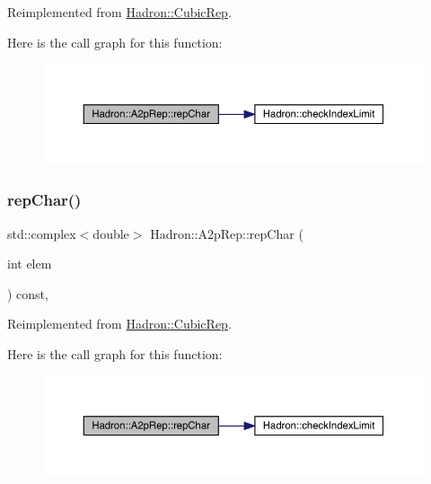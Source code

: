 Reimplemented from \mbox{\hyperlink{structHadron_1_1CubicRep_af45227106e8e715e84b0af69cd3b36f8}{Hadron\+::\+Cubic\+Rep}}.

Here is the call graph for this function\+:
\nopagebreak
\begin{figure}[H]
\begin{center}
\leavevmode
\includegraphics[width=350pt]{d4/d33/structHadron_1_1A2pRep_a7e7d7668295318bf08c6ab79ce2208e6_cgraph}
\end{center}
\end{figure}
\mbox{\label{structHadron_1_1A2pRep_a7e7d7668295318bf08c6ab79ce2208e6}} 
\subsubsection{\texorpdfstring{repChar()}{repChar()}\hspace{0.1cm}{\footnotesize\ttfamily [3/3]}}
{\footnotesize\ttfamily std\+::complex$<$double$>$ Hadron\+::\+A2p\+Rep\+::rep\+Char (\begin{DoxyParamCaption}\item[{int}]{elem }\end{DoxyParamCaption}) const\hspace{0.3cm}{\ttfamily [inline]}, {\ttfamily [virtual]}}



Reimplemented from \mbox{\hyperlink{structHadron_1_1CubicRep_af45227106e8e715e84b0af69cd3b36f8}{Hadron\+::\+Cubic\+Rep}}.

Here is the call graph for this function\+:
\nopagebreak
\begin{figure}[H]
\begin{center}
\leavevmode
\includegraphics[width=350pt]{d4/d33/structHadron_1_1A2pRep_a7e7d7668295318bf08c6ab79ce2208e6_cgraph}
\end{center}
\end{figure}
\mbox{\label{structHadron_1_1A2pRep_aeede31465f59cff568c2ada0aa32ac37}} 
